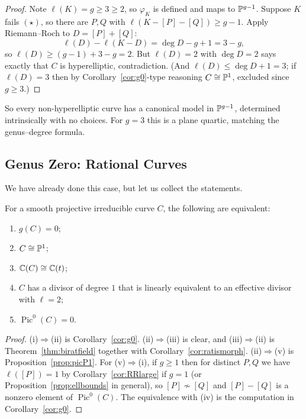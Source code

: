 \documentclass[a4paper]{scrartcl}
\DeclareMathOperator{\Pic}{Pic}
\begin{document}
\begin{proof}
	Note $\ell(K) = g \geq 3 \geq 2$, so $\varphi_K$ is defined and maps to $\mathbb{P}^{g-1}$. Suppose $K$ fails $(\star)$, so there are $P,Q$ with $\ell(K - [P]-[Q]) \geq g - 1$. Apply Riemann--Roch to $D = [P]+[Q]$:
	$$\ell(D) - \ell(K-D) = \deg D - g + 1 = 3 - g,$$
	so $\ell(D) \geq (g-1) + 3 - g = 2$. But $\ell(D) = 2$ with $\deg D = 2$ says exactly that $C$ is hyperelliptic, contradiction. (And $\ell(D)\leq \deg D + 1 = 3$; if $\ell(D) = 3$ then by Corollary~\ref{cor:g0}-type reasoning $C\cong\mathbb{P}^1$, excluded since $g \geq 3$.)
\end{proof}

So every non-hyperelliptic curve has a canonical model in $\mathbb{P}^{g-1}$, determined intrinsically with no choices. For $g = 3$ this is a plane quartic, matching the genus--degree formula.

\subsection{Genus Zero: Rational Curves}

We have already done this case, but let us collect the statements.

\begin{theorem}
	For a smooth projective irreducible curve $C$, the following are equivalent:
	\begin{enumerate}[label=(\roman*)]
		\item $g(C) = 0$;
		\item $C \cong \mathbb{P}^1$;
		\item $\mathbb{C}(C) \cong \mathbb{C}(t)$;
		\item $C$ has a divisor of degree $1$ that is linearly equivalent to an effective divisor with $\ell = 2$;
		\item $\Pic^0(C) = 0$.
	\end{enumerate}
\end{theorem}

\begin{proof}
	(i)$\Rightarrow$(ii) is Corollary~\ref{cor:g0}. (ii)$\Rightarrow$(iii) is clear, and (iii)$\Rightarrow$(ii) is Theorem~\ref{thm:biratfield} together with Corollary~\ref{cor:ratismorph}. (ii)$\Rightarrow$(v) is Proposition~\ref{prop:picP1}. For (v)$\Rightarrow$(i), if $g \geq 1$ then for distinct $P,Q$ we have $\ell([P]) = 1$ by Corollary~\ref{cor:RRlarge} if $g = 1$ (or Proposition~\ref{prop:ellbounds} in general), so $[P]\not\sim[Q]$ and $[P]-[Q]$ is a nonzero element of $\Pic^0(C)$. The equivalence with (iv) is the computation in Corollary~\ref{cor:g0}.
\end{proof}
\end{document}
